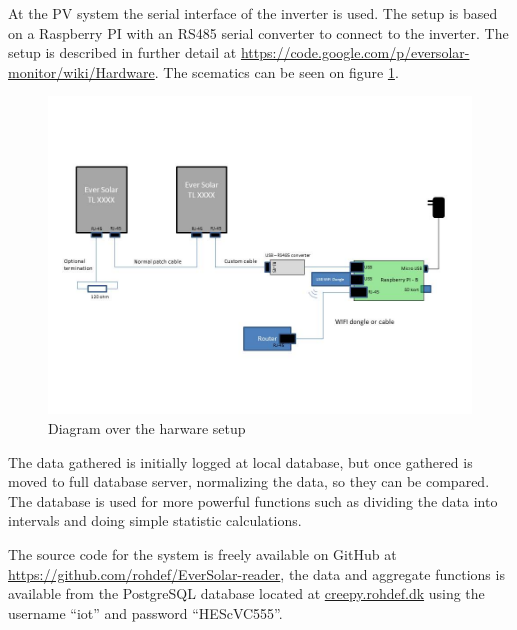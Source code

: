 At the PV system the serial interface of the inverter is used.  The
setup is based on a Raspberry PI with an RS485 serial converter to
connect to the inverter.  The setup is described in further detail at
\url{https://code.google.com/p/eversolar-monitor/wiki/Hardware}.  The
scematics can be seen on figure \ref{fig:hardware}.

\begin{figure}[h]
  \centering
  \includegraphics{hardware.jpg}
  \caption{Diagram over the harware setup}
  \label{fig:hardware}
\end{figure}

The data gathered is initially logged at local database, but once
gathered is moved to full database server, normalizing the data, so
they can be compared.  The database is used for more powerful
functions such as dividing the data into intervals and doing simple
statistic calculations.

The source code for the system is freely available on GitHub at
\url{https://github.com/rohdef/EverSolar-reader}, the data and
aggregate functions is available from the PostgreSQL database located
at \url{creepy.rohdef.dk} using the username ``iot'' and password
``HEScVC555''.

